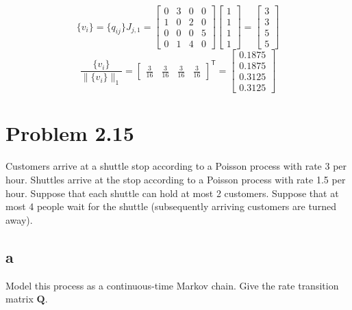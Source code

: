 \documentclass[letterpaper]{amsart}
\begin{document}
\begin{equation}
  \{v_i\}=
  \{q_{ij}\}J_{j,1} =
\begin{bmatrix}
  0 & 3 & 0 & 0 \\
  1 & 0 & 2 & 0 \\
  0 & 0 & 0 & 5 \\
  0 & 1 & 4 & 0
\end{bmatrix}
\begin{bmatrix}
  1 \\ 1 \\ 1 \\ 1
\end{bmatrix}
=
\begin{bmatrix}
  3 \\ 3 \\ 5 \\ 5
\end{bmatrix}
\end{equation}
\begin{equation}
  \frac{\{v_i\}}{\lVert\{v_i\}\rVert_1}
  =
\begin{bmatrix}
  \frac{3}{16} & \frac{3}{16} & \frac{3}{16} & \frac{3}{16}
\end{bmatrix}^\mathsf{T}
=
\begin{bmatrix}
  0.1875 \\ 0.1875 \\ 0.3125 \\ 0.3125
\end{bmatrix}
\end{equation}

\section{Problem 2.15} %
Customers arrive at a shuttle stop according to a Poisson process with rate 3
per hour. Shuttles arrive at the stop according to a Poisson process with
rate 1.5 per hour. Suppose that each shuttle can hold at most 2 customers.
Suppose that at most 4 people wait for the shuttle (subsequently arriving
customers are turned away).
\subsection*{a}
 Model this process as a continuous-time Markov chain. Give the rate
 transition matrix $\mathbf{Q}$.
\end{document}
